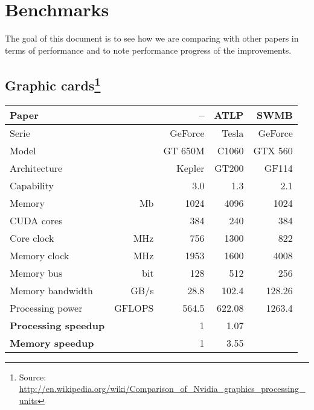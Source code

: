 %

%

\newpage
\section{Benchmarks}

The goal of this document is to see how we are comparing with other papers in terms of performance and to note performance progress of the improvements.

\subsection*{Graphic cards\footnote{Source: \url{http://en.wikipedia.org/wiki/Comparison_of_Nvidia_graphics_processing_units}}}
\def\unt#1{& \footnotesize #1}
\begin{center}\begin{tabular}{lrrrr} \toprule
\bf Paper		&				& \bf -- 		& \bf  ATLP\cite{gpu_atlp} & \bf SWMB\cite{swat_mega} \\ \midrule
Serie		&				& GeForce	& Tesla	& GeForce  \\
Model		&				& GT 650M	& C1060	& GTX 560 \\
Architecture	&				& Kepler		& GT200	& GF114 \\
Capability		&				& 3.0		& 1.3	& 2.1 \\
Memory \unt{Mb}				& 1024		& 4096	& 1024 \\
CUDA cores &					& 384		& 240	& 384 \\
Core clock \unt{MHz}			& 756		& 1300	& 822 \\
Memory clock \unt{MHz}			& 1953		& 1600	& 4008 \\
Memory bus \unt{bit}				& 128		& 512	& 256 \\
Memory bandwidth \unt{GB/s}		& 28.8		& 102.4	& 128.26 \\
Processing power \unt{GFLOPS}	&564.5		& 622.08	& 1263.4 \\ \midrule
\bf Processing speedup & 		& 1			& 1.07	& \\
\bf Memory speedup & 			& 1			& 3.55	& \\ \bottomrule
\end{tabular}\end{center}

